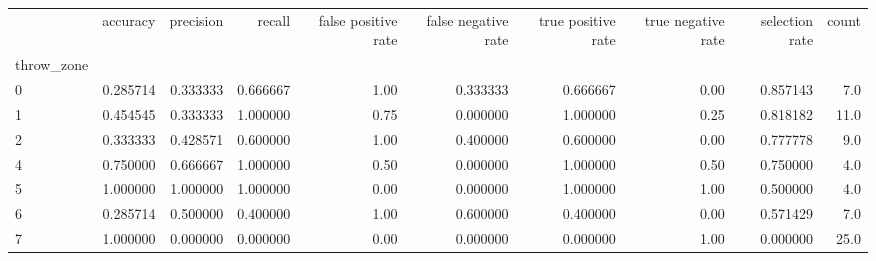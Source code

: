 \begin{tabular}{lrrrrrrrrr}
\toprule
{} &  accuracy &  precision &    recall &  false positive rate &  false negative rate &  true positive rate &  true negative rate &  selection rate &  count \\
throw\_zone &           &            &           &                      &                      &                     &                     &                 &        \\
\midrule
0          &  0.285714 &   0.333333 &  0.666667 &                 1.00 &             0.333333 &            0.666667 &                0.00 &        0.857143 &    7.0 \\
1          &  0.454545 &   0.333333 &  1.000000 &                 0.75 &             0.000000 &            1.000000 &                0.25 &        0.818182 &   11.0 \\
2          &  0.333333 &   0.428571 &  0.600000 &                 1.00 &             0.400000 &            0.600000 &                0.00 &        0.777778 &    9.0 \\
4          &  0.750000 &   0.666667 &  1.000000 &                 0.50 &             0.000000 &            1.000000 &                0.50 &        0.750000 &    4.0 \\
5          &  1.000000 &   1.000000 &  1.000000 &                 0.00 &             0.000000 &            1.000000 &                1.00 &        0.500000 &    4.0 \\
6          &  0.285714 &   0.500000 &  0.400000 &                 1.00 &             0.600000 &            0.400000 &                0.00 &        0.571429 &    7.0 \\
7          &  1.000000 &   0.000000 &  0.000000 &                 0.00 &             0.000000 &            0.000000 &                1.00 &        0.000000 &   25.0 \\
\bottomrule
\end{tabular}
